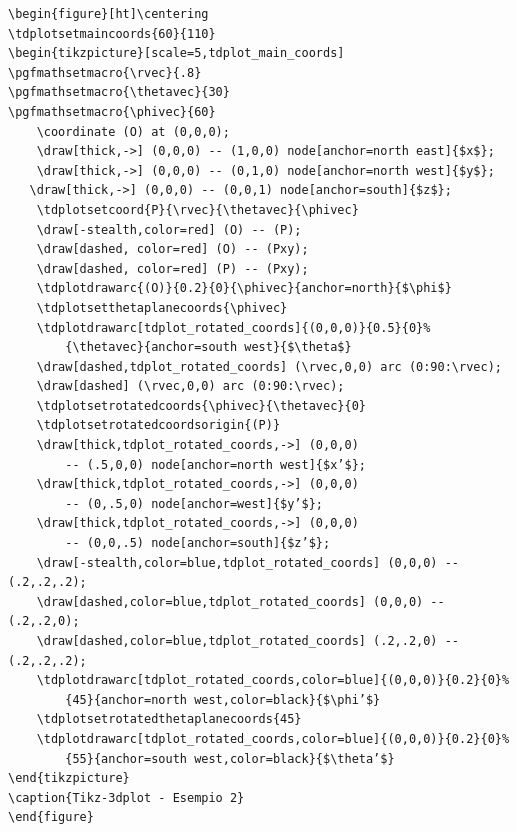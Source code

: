\newpage
\begin{verbatim}
\begin{figure}[ht]\centering
\tdplotsetmaincoords{60}{110}
\begin{tikzpicture}[scale=5,tdplot_main_coords]
\pgfmathsetmacro{\rvec}{.8}
\pgfmathsetmacro{\thetavec}{30}
\pgfmathsetmacro{\phivec}{60}
    \coordinate (O) at (0,0,0);
    \draw[thick,->] (0,0,0) -- (1,0,0) node[anchor=north east]{$x$};
    \draw[thick,->] (0,0,0) -- (0,1,0) node[anchor=north west]{$y$};
   \draw[thick,->] (0,0,0) -- (0,0,1) node[anchor=south]{$z$};
    \tdplotsetcoord{P}{\rvec}{\thetavec}{\phivec}
    \draw[-stealth,color=red] (O) -- (P);
    \draw[dashed, color=red] (O) -- (Pxy);
    \draw[dashed, color=red] (P) -- (Pxy);
    \tdplotdrawarc{(O)}{0.2}{0}{\phivec}{anchor=north}{$\phi$}
    \tdplotsetthetaplanecoords{\phivec}
    \tdplotdrawarc[tdplot_rotated_coords]{(0,0,0)}{0.5}{0}%
        {\thetavec}{anchor=south west}{$\theta$}
    \draw[dashed,tdplot_rotated_coords] (\rvec,0,0) arc (0:90:\rvec);
    \draw[dashed] (\rvec,0,0) arc (0:90:\rvec);
    \tdplotsetrotatedcoords{\phivec}{\thetavec}{0}
    \tdplotsetrotatedcoordsorigin{(P)}
    \draw[thick,tdplot_rotated_coords,->] (0,0,0)
        -- (.5,0,0) node[anchor=north west]{$x’$};
    \draw[thick,tdplot_rotated_coords,->] (0,0,0)
        -- (0,.5,0) node[anchor=west]{$y’$};
    \draw[thick,tdplot_rotated_coords,->] (0,0,0)
        -- (0,0,.5) node[anchor=south]{$z’$};
    \draw[-stealth,color=blue,tdplot_rotated_coords] (0,0,0) -- (.2,.2,.2);
    \draw[dashed,color=blue,tdplot_rotated_coords] (0,0,0) -- (.2,.2,0);
    \draw[dashed,color=blue,tdplot_rotated_coords] (.2,.2,0) -- (.2,.2,.2);
    \tdplotdrawarc[tdplot_rotated_coords,color=blue]{(0,0,0)}{0.2}{0}%
        {45}{anchor=north west,color=black}{$\phi’$}
    \tdplotsetrotatedthetaplanecoords{45}
    \tdplotdrawarc[tdplot_rotated_coords,color=blue]{(0,0,0)}{0.2}{0}%
        {55}{anchor=south west,color=black}{$\theta’$}
\end{tikzpicture}
\caption{Tikz-3dplot - Esempio 2}
\end{figure}
\end{verbatim}

